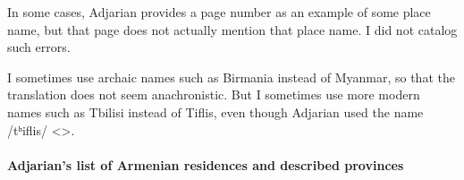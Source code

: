 \documentclass[output=paper]{langscibook}
\begin{document}
In some cases, Adjarian provides a page number as an example of some place name, but that page does not actually mention that place name. I did not  catalog such errors. 

I sometimes use archaic names such as Birmania instead of Myanmar, so that the translation does not seem anachronistic. But I sometimes use more modern names such as Tbilisi instead of Tiflis, even though Adjarian used the name /tʰiflis/ <>.



\paragraph*{Adjarian's  list of Armenian residences and described provinces}~\label{tab:long}\\
\end{document}
